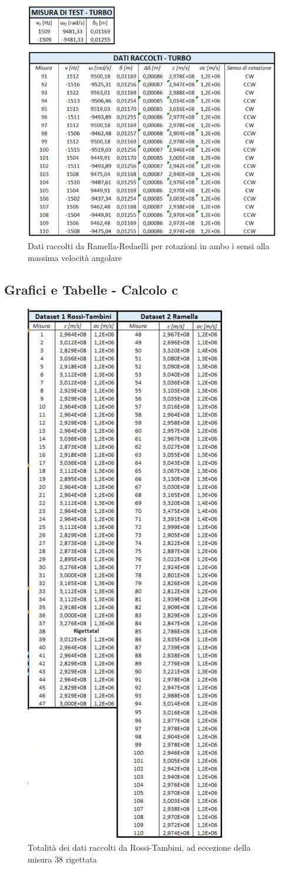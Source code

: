 \documentclass{article}
\begin{document}
\begin{figure}[h]
    \centering
    \includegraphics[width=0.6\linewidth]{RAM_TURBO.JPG}
    \caption{Dati raccolti da Ramella-Redaelli per rotazioni in ambo i sensi alla massima velocità angolare}
    \label{RAM_TURBO}
\end{figure}

\FloatBarrier

\subsection{Grafici e Tabelle - Calcolo c} \label{C}

\begin{figure}[h!]
    \centering
    \includegraphics[width=0.47\linewidth]{Dati_Completi.JPG}
    \caption{Totalità dei dati raccolti da Rossi-Tambini, ad eccezione della misura 38 rigettata}
    \label{Dati_Completi}
\end{figure}
\end{document}
